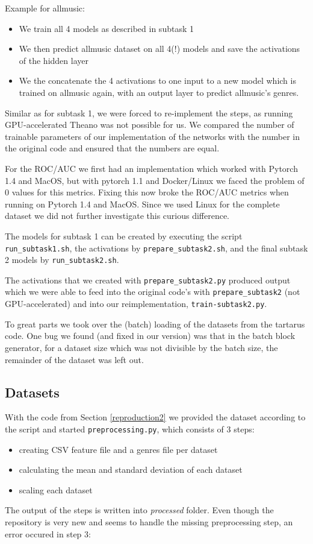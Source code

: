 \documentclass[sigconf,nonacm]{acmart}
\begin{document}
Example for allmusic: 
\begin{itemize}
  \item We train all 4 models as described in subtask 1
  \item We then predict allmusic dataset on all 4(!) models and save the activations of the hidden layer
  \item We the concatenate the 4 activations to one input
  to a new model which is trained on allmusic again, with an
  output layer to predict allmusic's genres.
\end{itemize}

Similar as for subtask 1, we were forced to re-implement the steps,
as running GPU-accelerated Theano was not possible for us.
We compared the number of trainable parameters of our implementation
of the networks with the number in the original code and ensured
that the numbers are equal.

For the ROC/AUC we first had an implementation which worked with
Pytorch 1.4 and MacOS, but with pytorch 1.1 and Docker/Linux
we faced the problem of 0 values for this metrics.
Fixing this now broke the ROC/AUC metrics when running on
Pytorch 1.4 and MacOS.
Since we used Linux for the complete dataset we did not further
investigate this curious difference.

The models for subtask 1 can be created by executing
the script
\texttt{run\_subtask1.sh},
the activations by 
\texttt{prepare\_subtask2.sh}, and the final subtask 2
models by \texttt{run\_subtask2.sh}.

The activations that we created with \texttt{prepare\_subtask2.py}
produced output which we were able to feed into the
original code's with \texttt{prepare\_subtask2} (not GPU-accelerated)
and into our reimplementation, \texttt{train-subtask2.py}.

To great parts we took over the (batch) loading of the datasets from the tartarus code.
One bug we found (and fixed in our version) was that in the batch block generator, for a dataset size 
which was not divisible by the batch size, the remainder of the dataset was left out.

\subsection{Datasets}

With the code from Section \ref{reproduction2} we provided the dataset
according to the script and started \texttt{preprocessing.py},
which consists of 3 steps:
\begin{itemize}
  \item creating CSV feature file and a genres file per dataset
  \item calculating the mean and standard deviation of each dataset
  \item scaling each dataset
\end{itemize}
The output of the steps is written into \textit{processed} folder.
Even though the repository is very new and seems to handle the missing preprocessing step, an error occured in step 3:
\end{document}
